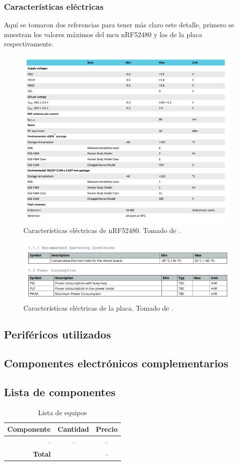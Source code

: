 \subsubsection*{Características eléctricas}
Aquí se tomaron dos referencias para tener más claro este detalle,  primero se muestran los valores máximos del mcu nRF52480 y los de la placa respectivamente.
\begin{figure}[H]
\centering
\includegraphics[width=.55\linewidth]{Imagenes/3.png}
 \caption{Características eléctricas de nRF52480. Tomado de \cite{web}.}
 \label{fig3}
 
\end{figure}
\begin{figure}[H]
\centering
\includegraphics[width=.55\linewidth]{Imagenes/3.1.png}
 \caption{ Características eléctricas de la placa. Tomado de \cite{web2}.}
 \label{fig3.1}
\end{figure}


\subsection*{Periféricos utilizados}
\subsection*{Componentes electrónicos complementarios}
\subsection*{Lista de componentes}
\begin{table}[H]
\caption{Lista de equipos}
\label{table_2}
\begin{center}
\begin{tabular}{r|cc}
\hline
\textbf{Componente}&\textbf{Cantidad}&\textbf{Precio}\\
 \hline
--&--&-- \\ \hline 

 \textbf{Total}& & -- \\
 \hline
\end{tabular}
\end{center}
\end{table}

